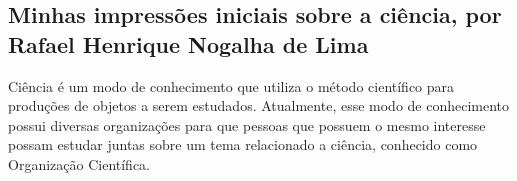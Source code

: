 \subsection{Minhas impressões iniciais sobre a ciência, por Rafael Henrique Nogalha de Lima}


Ciência é um modo de conhecimento que utiliza o método científico para produções de objetos a serem estudados. Atualmente, esse modo de conhecimento possui diversas organizações para que pessoas que possuem o mesmo interesse possam estudar juntas sobre um tema relacionado a ciência, conhecido como \gls{Organização} Científica.



